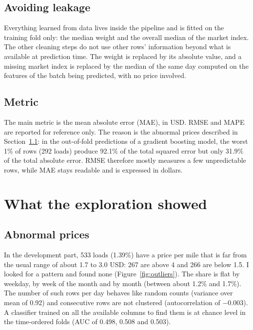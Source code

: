 \documentclass[a4paper,11pt]{article}
\begin{document}
\subsection{Avoiding leakage}

Everything learned from data lives inside the pipeline and is fitted on the training fold only: the median weight and the overall median of the market index. The other cleaning steps do not use other rows' information beyond what is available at prediction time. The weight is replaced by its absolute value, and a missing market index is replaced by the median of the same day computed on the features of the batch being predicted, with no price involved.

\subsection{Metric}

The main metric is the mean absolute error (MAE), in USD. RMSE and MAPE are reported for reference only. The reason is the abnormal prices described in Section~\ref{sec:outliers}: in the out-of-fold predictions of a gradient boosting model, the worst 1\% of rows (292 loads) produce 92.1\% of the total squared error but only 31.9\% of the total absolute error. RMSE therefore mostly measures a few unpredictable rows, while MAE stays readable and is expressed in dollars.

\section{What the exploration showed}

\subsection{Abnormal prices}
\label{sec:outliers}

In the development part, 533 loads (1.39\%) have a price per mile that is far from the usual range of about 1.7 to 3.0 USD: 267 are above 4 and 266 are below 1.5. I looked for a pattern and found none (Figure~\ref{fig:outliers}). The share is flat by weekday, by week of the month and by month (between about 1.2\% and 1.7\%). The number of such rows per day behaves like random counts (variance over mean of 0.92) and consecutive rows are not clustered (autocorrelation of $-0.003$). A classifier trained on all the available columns to find them is at chance level in the time-ordered folds (AUC of 0.498, 0.508 and 0.503).
\end{document}
